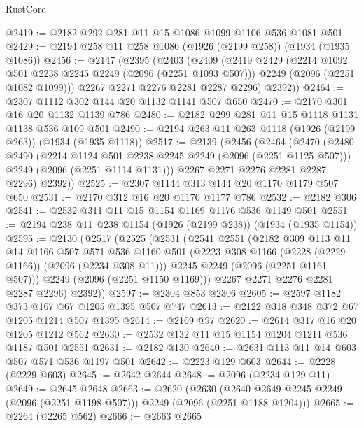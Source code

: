 \begin{lexlean}{RustCore}
\begin{coremodule}
@2419 := @2182 @292 @281 @11 @15 @1086 @1099 @1106 @536 @1081 @501
@2429 := @2194 @258 @11 @258 @1086 (@1926 (@2199 @258)) (@1934 (@1935 @1086))
@2456 := @2147
    (@2395
      (@2403
        (@2409
          (@2419
            @2429
            (@2214 @1092 @501 @2238 @2245 @2249 (@2096 (@2251 @1093 @507)))
            @2249
            (@2096 (@2251 @1082 @1099)))
          @2267
          @2271
          @2276
          @2281
          @2287
          @2296)
        @2392))
@2464 := @2307 @1112 @302 @144 @20 @1132 @1141 @507 @650
@2470 := @2170 @301 @16 @20 @1132 @1139 @786
@2480 := @2182 @299 @281 @11 @15 @1118 @1131 @1138 @536 @109 @501
@2490 := @2194 @263 @11 @263 @1118 (@1926 (@2199 @263)) (@1934 (@1935 @1118))
@2517 := @2139
    (@2456
      (@2464
        (@2470
          (@2480
            @2490
            (@2214 @1124 @501 @2238 @2245 @2249 (@2096 (@2251 @1125 @507)))
            @2249
            (@2096 (@2251 @1114 @1131)))
          @2267
          @2271
          @2276
          @2281
          @2287
          @2296)
        @2392))
@2525 := @2307 @1144 @313 @144 @20 @1170 @1179 @507 @650
@2531 := @2170 @312 @16 @20 @1170 @1177 @786
@2532 := @2182 @306
@2541 := @2532 @311 @11 @15 @1154 @1169 @1176 @536 @1149 @501
@2551 := @2194 @238 @11 @238 @1154 (@1926 (@2199 @238)) (@1934 (@1935 @1154))
@2595 := @2130
    (@2517
      (@2525
        (@2531
          (@2541
            @2551
            (@2182
              @309
              @113
              @11
              @14
              @1166
              @507
              @571
              @536
              @1160
              @501
              (@2223 @308 @1166 (@2228 (@2229 @1166)) (@2096 (@2234 @308 @11)))
              @2245
              @2249
              (@2096 (@2251 @1161 @507)))
            @2249
            (@2096 (@2251 @1150 @1169)))
          @2267
          @2271
          @2276
          @2281
          @2287
          @2296)
        @2392))
@2597 := @2304 @853 @2306
@2605 := @2597 @1182 @373 @167 @67 @1205 @1395 @507 @747
@2613 := @2122 @318 @348 @372 @67 @1205 @1214 @507 @1395
@2614 := @2169 @97
@2620 := @2614 @317 @16 @20 @1205 @1212 @562
@2630 := @2532 @132 @11 @15 @1154 @1204 @1211 @536 @1187 @501 @2551
@2631 := @2182 @130
@2640 := @2631 @113 @11 @14 @603 @507 @571 @536 @1197 @501
@2642 := @2223 @129 @603
@2644 := @2228 (@2229 @603)
@2645 := @2642 @2644
@2648 := @2096 (@2234 @129 @11)
@2649 := @2645 @2648
@2663 := @2620
    (@2630 (@2640 @2649 @2245 @2249 (@2096 (@2251 @1198 @507))) @2249 (@2096 (@2251 @1188 @1204)))
@2665 := @2264 (@2265 @562)
@2666 := @2663 @2665

\end{coremodule}
\end{lexlean}
